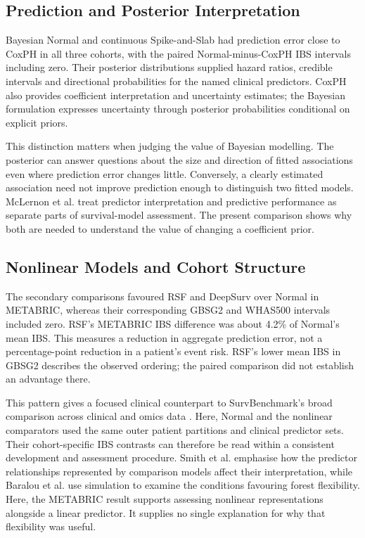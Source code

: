 \subsection{Prediction and Posterior Interpretation}\label{did-bayesian-models-outperform-classical-models}

Bayesian Normal and continuous Spike-and-Slab had prediction error close to CoxPH in all three cohorts, with the paired Normal-minus-CoxPH IBS intervals including zero. Their posterior distributions supplied hazard ratios, credible intervals and directional probabilities for the named clinical predictors. CoxPH also provides coefficient interpretation and uncertainty estimates; the Bayesian formulation expresses uncertainty through posterior probabilities conditional on explicit priors.

This distinction matters when judging the value of Bayesian modelling. The posterior can answer questions about the size and direction of fitted associations even where prediction error changes little. Conversely, a clearly estimated association need not improve prediction enough to distinguish two fitted models. McLernon et al. \cite{ref84} treat predictor interpretation and predictive performance as separate parts of survival-model assessment. The present comparison shows why both are needed to understand the value of changing a coefficient prior.

\subsection{Nonlinear Models and Cohort Structure}\label{did-nonlinear-machine-learning-always-outperform-bayesian-models}

The secondary comparisons favoured RSF and DeepSurv over Normal in METABRIC, whereas their corresponding GBSG2 and WHAS500 intervals included zero. RSF's METABRIC IBS difference was about 4.2\% of Normal's mean IBS. This measures a reduction in aggregate prediction error, not a percentage-point reduction in a patient's event risk. RSF's lower mean IBS in GBSG2 describes the observed ordering; the paired comparison did not establish an advantage there.

This pattern gives a focused clinical counterpart to SurvBenchmark's broad comparison across clinical and omics data \cite{ref33}. Here, Normal and the nonlinear comparators used the same outer patient partitions and clinical predictor sets. Their cohort-specific IBS contrasts can therefore be read within a consistent development and assessment procedure. Smith et al. \cite{ref44} emphasise how the predictor relationships represented by comparison models affect their interpretation, while Baralou et al. \cite{ref37} use simulation to examine the conditions favouring forest flexibility. Here, the METABRIC result supports assessing nonlinear representations alongside a linear predictor. It supplies no single explanation for why that flexibility was useful.

